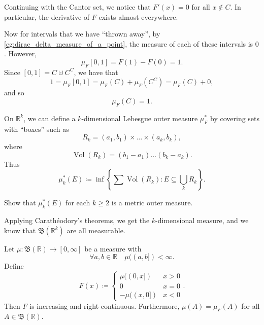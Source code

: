 \documentclass[notoc,notitlepage]{tufte-book}
\DeclareMathOperator{\Vol}{Vol}
\begin{document}
Continuing with the Cantor set, we notice that $F'(x) = 0$ for all $x \notin C$.
In particular, the derivative of $F$ exists almost everywhere.

Now for intervals that we have ``thrown away'', by
\cref{eg:dirac_delta_measure_of_a_point}, the measure of each
of these intervals is $0$.
However,
\begin{equation*}
  \mu_F [0, 1] = F(1) - F(0) = 1.
\end{equation*}
Since $[0, 1] = C \cupdot C^C$, we have that
\begin{equation*}
  1 = \mu_F [0, 1] = \mu_F(C) + \mu_F(C^C) = \mu_F(C) + 0,
\end{equation*}
and so
\begin{equation*}
  \mu_F(C) = 1.
\end{equation*}

\begin{remark}
  On $\mathbb{R}^k$, we can define a $k$-dimensional Lebesgue outer measure
  $\mu_F^*$ by covering sets with ``boxes'' such as
  \begin{equation*}
    R_k = (a_1, b_1) \times \hdots \times (a_k, b_k),
  \end{equation*}
  where
  \begin{equation*}
    \Vol(R_k) = (b_1 - a_1) \hdots (b_k - a_k).
  \end{equation*}
  Thus
  \begin{equation*}
    \mu_k^*(E) \coloneqq \inf \left\{ 
      \sum \Vol(R_k)
        : E \subseteq \bigcup_{k} R_k
    \right\}.
  \end{equation*}

  \begin{ex}
    Show that $\mu_k^*(E)$ for each $k \geq 2$ is a metric outer measure.
  \end{ex}

  Applying Carathéodory's theorems, we get the $k$-dimensional measure,
  and we know that $\mathfrak{B}(\mathbb{R}^k)$ are all measurable.
\end{remark}

\begin{thm}\label{thm:a_measure_constructed_by_another_measure}
  Let $\mu : \mathfrak{B}(\mathbb{R}) \to [0, \infty]$ be a measure with
  \begin{equation*}
    \forall a, b \in \mathbb{R} \quad \mu((a, b]) < \infty.
  \end{equation*}
  Define
  \begin{equation*}
    F(x) \coloneqq \begin{cases}
      \mu((0, x])  & x > 0 \\
      0            & x = 0 \\
      -\mu((x, 0]) & x < 0
    \end{cases}.
  \end{equation*}
  Then $F$ is increasing and right-continuous.
  Furthermore, $\mu(A) = \mu_F(A)$ for all $A \in \mathfrak{B}(\mathbb{R})$.
\end{thm}
\end{document}
